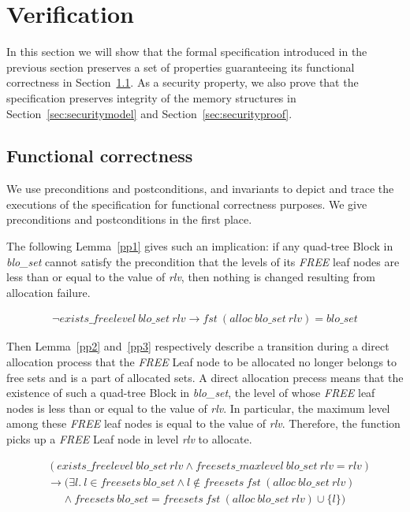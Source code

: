 \section{Verification}
In this section we will show that the formal specification introduced in the previous section preserves a set of properties guaranteeing its functional correctness in Section~\ref{sec:functional}. As a security property, we also prove that the specification preserves integrity of the memory structures in Section~\ref{sec:securitymodel} and Section~\ref{sec:securityproof}.

\subsection{Functional correctness}\label{sec:functional}
We use preconditions and postconditions, and invariants to depict and trace the executions of the specification for functional correctness purposes. We give preconditions and postconditions in the first place.

The following Lemma~\ref{pp1} gives such an implication: if any quad-tree Block in \emph{blo\_set} cannot satisfy the precondition that the levels of its \emph{FREE} leaf nodes are less than or equal to the value of \emph{rlv}, then nothing is changed resulting from allocation failure.

\begin{lemma} 
\label{pp1}
\end{lemma}
\vspace{-7pt}
{\footnotesize
\begin{align*}
\neg exists\_freelevel\ blo\_set\ rlv \longrightarrow fst\ (alloc\ blo\_set\ rlv) = blo\_set
\end{align*}
}
\vspace{-12pt}

Then Lemma~\ref{pp2} and~\ref{pp3} respectively describe a transition during a direct allocation process that the \emph{FREE} Leaf node to be allocated no longer belongs to free sets and is a part of allocated sets. A direct allocation precess means that the existence of such a quad-tree Block in \emph{blo\_set}, the level of whose \emph{FREE} leaf nodes is less than or equal to the value of \emph{rlv}. In particular, the maximum level among these \emph{FREE} leaf nodes is equal to the value of \emph{rlv}. Therefore, the function picks up a \emph{FREE} Leaf node in level \emph{rlv} to allocate.

\begin{lemma} 
\label{pp2}
\end{lemma}
\vspace{-7pt}
{\footnotesize
\begin{align*}
&(exists\_freelevel\ blo\_set\ rlv \wedge freesets\_maxlevel\ blo\_set\ rlv = rlv) \\ &\longrightarrow (\exists l.\ l \in freesets\ blo\_set \wedge l \notin freesets\ fst\ (alloc\ blo\_set\ rlv) \\
&\ \ \ \ \ \ \wedge freesets\ blo\_set = freesets\ fst\ (alloc\ blo\_set\ rlv) \cup \lbrace l \rbrace)
\end{align*}
}
\vspace{-12pt}

